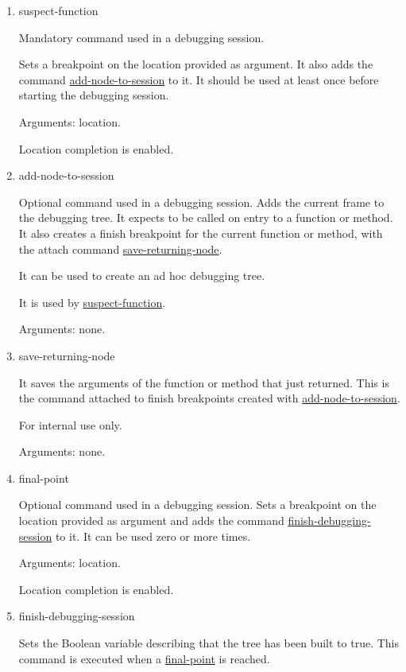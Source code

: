 \begin{enumerate}
    \item suspect-function
\label{command:suspect-function}

Mandatory command used in a debugging session.

Sets a breakpoint on the location provided as argument. It also adds the command \hyperref[command:add-node-to-session]{add-node-to-session} to it.
It should be used at least once before starting the debugging session.

Arguments: location.

Location completion is enabled.


\item add-node-to-session
\label{command:add-node-to-session}

Optional command used in a debugging session.
Adds the current frame to the debugging tree.
It expects to be called on entry to a function or method.
It also creates a finish breakpoint for the current function or method, with the attach command \hyperref[command:save-returning-node]{save-returning-node}.

It can be used to create an ad hoc debugging tree.

It is used by \hyperref[command:suspect-function]{suspect-function}.

Arguments: none.
\item save-returning-node
\label{command:save-returning-node}

It saves the arguments of the function or method that just returned.
This is the command attached to finish breakpoints created with \hyperref[command:add-node-to-session]{add-node-to-session}.

For internal use only.

Arguments: none.
\item final-point
\label{command:final-point}

Optional command used in a debugging session.
Sets a breakpoint on the location provided as argument and adds the command \hyperref[command:finish-debugging-session]{finish-debugging-session} to it.
It can be used zero or more times.

Arguments: location.

Location completion is enabled.
\item finish-debugging-session
\label{command:finish-debugging-session}

Sets the Boolean variable describing that the tree has been built to true.
This command is executed when a \hyperref[command:final-point]{final-point} is reached.


\end{enumerate}
